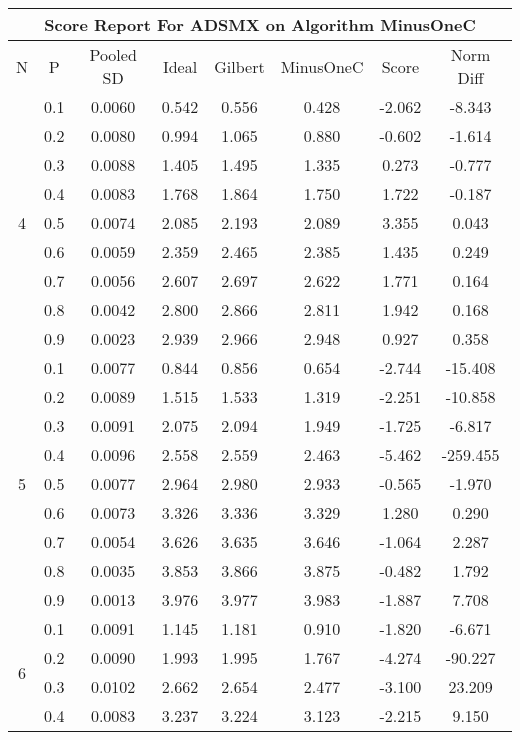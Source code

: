 \documentclass[11pt,a4paper]{report}
\begin{document}
\begin{longtable}{ | c | c || c | c | c | c | c | c | }
\hline
\multicolumn{8}{|c|}{ Score Report For ADSMX on Algorithm MinusOneC} \\
\hline
N & P & Pooled SD &  Ideal &  Gilbert & MinusOneC  & Score & Norm Diff \\
 \hline
 \hline
 \endhead
\multirow{9}{*}{4} & 0.1 & 0.0060 & 0.542 & 0.556 & 0.428 & -2.062 & -8.343 \\
 & 0.2 & 0.0080 & 0.994 & 1.065 & 0.880 & -0.602 & -1.614 \\
 & 0.3 & 0.0088 & 1.405 & 1.495 & 1.335 & 0.273 & -0.777 \\
 & 0.4 & 0.0083 & 1.768 & 1.864 & 1.750 & 1.722 & -0.187 \\
 & 0.5 & 0.0074 & 2.085 & 2.193 & 2.089 & 3.355 & 0.043 \\
 & 0.6 & 0.0059 & 2.359 & 2.465 & 2.385 & 1.435 & 0.249 \\
 & 0.7 & 0.0056 & 2.607 & 2.697 & 2.622 & 1.771 & 0.164 \\
 & 0.8 & 0.0042 & 2.800 & 2.866 & 2.811 & 1.942 & 0.168 \\
 & 0.9 & 0.0023 & 2.939 & 2.966 & 2.948 & 0.927 & 0.358 \\
 \hline
\multirow{9}{*}{5} & 0.1 & 0.0077 & 0.844 & 0.856 & 0.654 & -2.744 & -15.408 \\
 & 0.2 & 0.0089 & 1.515 & 1.533 & 1.319 & -2.251 & -10.858 \\
 & 0.3 & 0.0091 & 2.075 & 2.094 & 1.949 & -1.725 & -6.817 \\
 & 0.4 & 0.0096 & 2.558 & 2.559 & 2.463 & -5.462 & -259.455 \\
 & 0.5 & 0.0077 & 2.964 & 2.980 & 2.933 & -0.565 & -1.970 \\
 & 0.6 & 0.0073 & 3.326 & 3.336 & 3.329 & 1.280 & 0.290 \\
 & 0.7 & 0.0054 & 3.626 & 3.635 & 3.646 & -1.064 & 2.287 \\
 & 0.8 & 0.0035 & 3.853 & 3.866 & 3.875 & -0.482 & 1.792 \\
 & 0.9 & 0.0013 & 3.976 & 3.977 & 3.983 & -1.887 & 7.708 \\
 \hline
\multirow{9}{*}{6} & 0.1 & 0.0091 & 1.145 & 1.181 & 0.910 & -1.820 & -6.671 \\
 & 0.2 & 0.0090 & 1.993 & 1.995 & 1.767 & -4.274 & -90.227 \\
 & 0.3 & 0.0102 & 2.662 & 2.654 & 2.477 & -3.100 & 23.209 \\
 & 0.4 & 0.0083 & 3.237 & 3.224 & 3.123 & -2.215 & 9.150 \\

\end{longtable}
\end{document}
